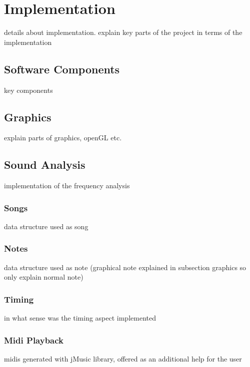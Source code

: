 
\chapter{Implementation}

details about implementation. explain key parts of the project in terms of the implementation

\section{Software Components}

key components

\section{Graphics}

explain parts of graphics, openGL etc.

\section{Sound Analysis}

implementation of the frequency analysis

\subsection{Songs}

data structure used as song

\subsection{Notes}

data structure used as note (graphical note explained in subsection graphics so only explain normal note)

\subsection{Timing}

in what sense was the timing aspect implemented

\subsection{Midi Playback}

midis generated with jMusic library, offered as an additional help for the user


